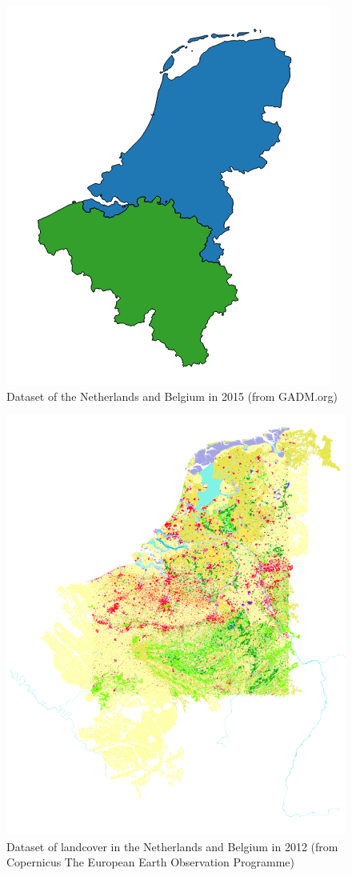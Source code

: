 \begin{figure}
	\centering
	\includegraphics[width=0.5\linewidth]{figs/Countries.png}
	\caption{Dataset of the Netherlands and Belgium in 2015 (from GADM.org)}
	\label{fig:countries}
\end{figure}

\begin{figure}
	\centering
	\includegraphics[width=1\linewidth]{figs/CORINE_NL_BE_color.PNG}
	\caption{Dataset of landcover in the Netherlands and Belgium in 2012 (from Copernicus  The European Earth Observation Programme)}
	\label{fig:CORINE}
\end{figure}


